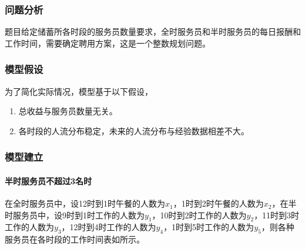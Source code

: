 
\subsubsection{问题分析}

题目给定储蓄所各时段的服务员数量要求，全时服务员和半时服务员的每日报酬和工作时间，需要确定聘用方案，这是一个整数规划问题。

\subsubsection{模型假设}

为了简化实际情况，模型基于以下假设，
\begin{enumerate}
    \item 总收益与服务员数量无关。
    \item 各时段的人流分布稳定，未来的人流分布与经验数据相差不大。
\end{enumerate}

\subsubsection{模型建立}

\paragraph{半时服务员不超过3名时} 在全时服务员中，设12时到1时午餐的人数为$x_1$，1时到2时午餐的人数为$x_2$，在半时服务员中，设9时到1时工作的人数为$y_1$，10时到2时工作的人数为$y_2$，11时到3时工作的人数为$y_3$，12时到4时工作的人数为$y_4$，1时到5时工作的人数为$y_5$，则各种服务员在各时段的工作时间表如所示。

